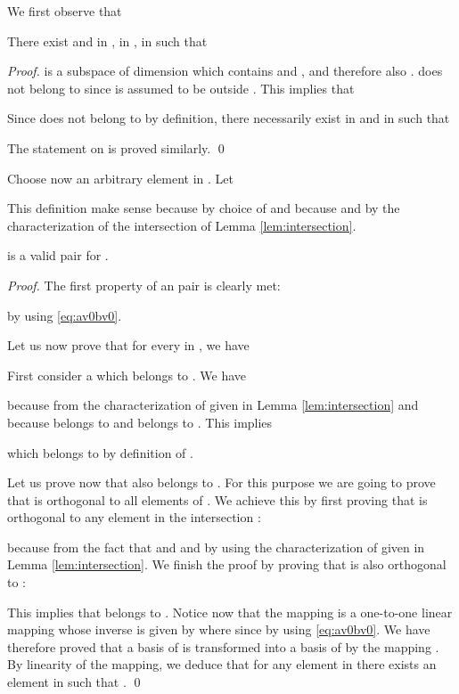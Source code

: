 \documentclass[runningheads,11pt]{llncs}
\begin{document}
We first observe that
\begin{lemma}
There exist  and  in ,  in ,  in  such that

\end{lemma}

\begin{proof}
 is a subspace of dimension  which contains  and , 
and therefore also .  does not belong to  since  is assumed to be outside
. This implies that

Since  does not belong to  by definition, there necessarily exist 
 in  and  in  such that

The statement on  is proved similarly.
\qed
\end{proof}

Choose now an arbitrary element  in . Let 

This definition make sense because  by choice of  and
 because  and by the characterization of
the intersection  of Lemma \ref{lem:intersection}.
\begin{proposition}
\label{prop:attack_Baldi}
 is a valid  pair for .
\end{proposition}

\begin{proof}
The first property of an  pair is clearly met:

by using \eqref{eq:av0bv0}.

Let us now prove that for every  in , we have

First consider a  which belongs to . We have

because  from the characterization of  given in Lemma
\ref{lem:intersection} and  because  belongs to  and 
 belongs to . This implies

which belongs to  by definition of .

Let us prove now that 
 also belongs to .
For this purpose we are going to prove that  is orthogonal to all elements of 
.
We achieve this by first proving that  is orthogonal to any element  in the 
intersection :

because  from the fact that  and  and
 by using the characterization of  given in 
Lemma \ref{lem:intersection}. We finish the proof
by  proving that  is also orthogonal to :

This implies that  belongs to . 
Notice now that the mapping 
 is a one-to-one linear mapping whose inverse is given by
 where 
 since  by using 
\eqref{eq:av0bv0}. We have therefore proved that a basis of  is transformed into a basis of  by the mapping
. By linearity of the mapping, we deduce that for any element  in  there
exists an element  in  such that .
\qed
\end{proof}
\end{document}
